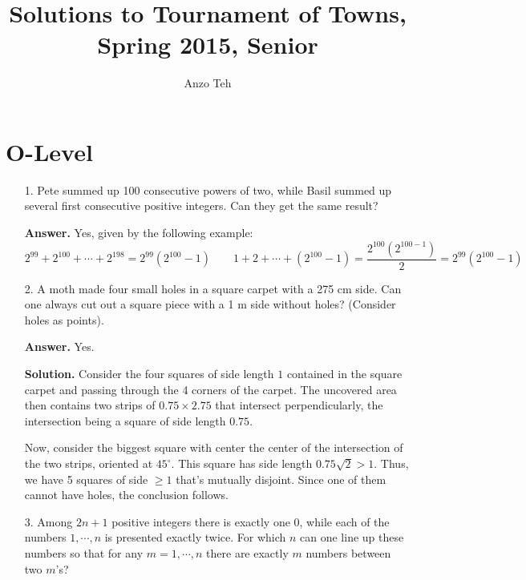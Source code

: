 \documentclass[11pt,a4paper]{article}
\begin{document}
\newcommand{\la}{\leftarrow}
\newcommand{\lra}{\leftrightarrow}
\newcommand{\bbN}{\mathbb{N}}
\newcommand{\bbZ}{\mathbb{Z}}
\newcommand{\dsum}{\displaystyle\sum}
\newcommand{\dprod}{\displaystyle\prod}


\title{Solutions to Tournament of Towns, Spring 2015, Senior}
\author{Anzo Teh}
\date{}
\maketitle

\section*{O-Level}
\begin{enumerate}
	\item[1.]
	Pete summed up 100 consecutive powers of two, while Basil summed up several
	first consecutive positive integers. Can they get the same result?
	
	\textbf{Answer.} Yes, given by the following example: 
	\[
	2^{99}+2^{100}+\cdots + 2^{198}
	=2^{99}(2^{100}-1)
	\qquad 
	1+2+\cdots + (2^{100}-1)
	=\frac{2^{100}(2^{100-1})}{2}
	=2^{99}(2^{100}-1)
	\]
	
	\item[2.]
	A moth made four small holes in a square carpet with a 275 cm side. Can one
	always cut out a square piece with a 1 m side without holes? (Consider holes
	as points).
	
	\textbf{Answer.} Yes. 
	
	\textbf{Solution.} Consider the four squares of side length $1$ contained in the square carpet and passing through the 4 corners of the carpet. 
	The uncovered area then contains two strips of $0.75\times 2.75$ that intersect perpendicularly, 
	the intersection being a square of side length $0.75$. 
	
	Now, consider the biggest square with center the center of the intersection of the two strips, 
	oriented at $45^{\circ}$. 
	This square has side length $0.75\sqrt{2} > 1$. Thus, we have 5 squares of side $\ge 1$ that's mutually disjoint. 
	Since one of them cannot have holes, the conclusion follows. 
	
	\item[3.]
	Among $2n+1$ positive integers there is exactly one 0, while each of the numbers
	$1, \cdots, n$ is presented exactly twice. 
	For which $n$ can one line up these numbers
	so that for any $m = 1, \cdots, n$ there are exactly $m$ numbers between two $m$’s?
	

\end{enumerate}
\end{document}

